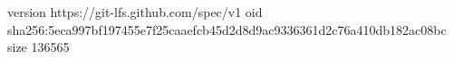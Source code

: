 version https://git-lfs.github.com/spec/v1
oid sha256:5eca997bf197455e7f25caaefcb45d2d8d9ac9336361d2c76a410db182ac08bc
size 136565

